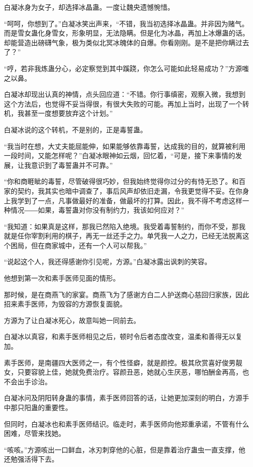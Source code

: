 \begin{this_body}
白凝冰身为女子，却选择冰晶蛊。一度让魏央遗憾惋惜。

“呵呵，你想到了。”白凝冰笑出声来，“不错，我当初选择冰晶蛊。并非因为赌气。而是雪女蛊化身雪女，形象明显，无法隐瞒。但是化为冰晶，再加上冰爆蛊的话。却能营造出磅礴气象，极为类似北冥冰魄体的自爆。你看刚刚。是不是把你瞒过去了？”

“哼，若非我炼蛊分心，必定察觉到其中蹊跷，你怎么可能如此轻易成功？”方源嗤之以鼻。

白凝冰却现出认真的神情，点头回应道：“不错。你行事缜密，观察入微，我想到这个方法后，也觉得不妥当得很，有很大失败的可能。再加上当时，出现了一个转机，我甚至一度想要放弃这个计划。”

白凝冰说的这个转机，不是别的，正是毒誓蛊。

“我当时在想，大丈夫能屈能伸，如果能够依靠毒誓，达成我的目的，就算被利用一段时间，又能怎样呢？”白凝冰眼神如云烟，回忆着，“可是，接下来事情的发展，让我意识到了毒誓蛊并不可靠。”

“你和商睚眦的毒誓，尽管破得很巧妙，但我始终觉得你过分的有恃无恐了。和百家的契约，我其实也暗中调查了，事后风声却依旧走漏，令我更觉得不妥。在你身上我学到了一点，凡事做最好的准备，做最坏的打算。因此，我不得不考虑这样一种情况――如果，毒誓蛊对你没有制约力，我该如何应对？”

“我知道：如果真是这样，那我已然陷入绝境。我受着毒誓制约，而你不受，那我就是任你宰割利用的棋子，再无一丝还手之力。单凭我一人之力，已经无法脱离这个困局，但在商家城中，还有一个人可以帮我。”

“说起这个人，我还得感谢你引见呢，方源。”白凝冰露出讽刺的笑容。

他想到第一次和素手医师见面的情形。

那时候，是在商燕飞的家宴。商燕飞为了感谢方白二人护送商心慈回归家族，因此招来素手医师，为毁容的方源恢复面貌。

方源为了让白凝冰死心，故意叫她一同前去。

白凝冰以真容，和素手医师相见之后，顿时令后者态度改变，温柔和善得无以复加。

素手医师，是南疆四大医师之一，有个性怪癖，就是颜控。极其欣赏喜好俊男靓女，只要容貌上佳，她就免费治疗。容颜丑恶，她就心生厌恶，哪怕酬金再高，也不会出手诊治。

白凝冰问及阴阳转身蛊的事情，素手医师回答的话，让她更加深刻的明白，方源手中那只阳蛊的重要性。

但同时，白凝冰也和素手医师结识。临走时，素手医师向他郑重承诺，不管有什么困难，尽管来找她。

“咳咳。”方源咳出一口鲜血，冰刃刺穿他的心脏，但是靠着治疗蛊虫一直支撑，他还勉强活得下去。


\end{this_body}
